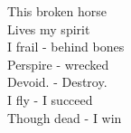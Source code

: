 This broken horse\\
Lives my spirit\\
I frail - behind bones\\
Perspire - wrecked\\
Devoid. - Destroy.\\
I fly - I succeed\\
Though dead - I win\\

